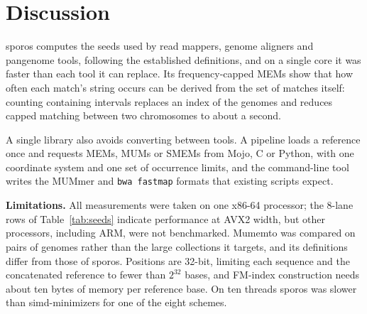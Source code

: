 \section{Discussion}

sporos computes the seeds used by read mappers, genome aligners and pangenome tools, following the established definitions, and on a single core it was faster than each tool it can replace. Its frequency-capped MEMs show that how often each match's string occurs can be derived from the set of matches itself: counting containing intervals replaces an index of the genomes and reduces capped matching between two chromosomes to about a second.

A single library also avoids converting between tools. A pipeline loads a reference once and requests MEMs, MUMs or SMEMs from Mojo, C or Python, with one coordinate system and one set of occurrence limits, and the command-line tool writes the MUMmer and \texttt{bwa fastmap} formats that existing scripts expect.

\textbf{Limitations.} All measurements were taken on one x86-64 processor; the 8-lane rows of Table~\ref{tab:seeds} indicate performance at AVX2 width, but other processors, including ARM, were not benchmarked. Mumemto was compared on pairs of genomes rather than the large collections it targets, and its definitions differ from those of sporos. Positions are 32-bit, limiting each sequence and the concatenated reference to fewer than \(2^{32}\) bases, and FM-index construction needs about ten bytes of memory per reference base. On ten threads sporos was slower than simd-minimizers for one of the eight schemes.
